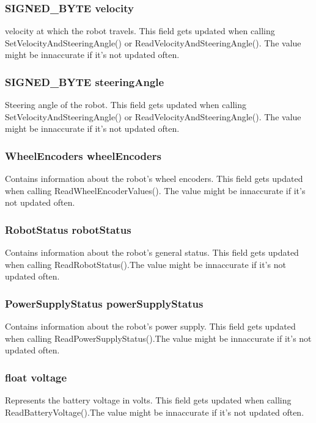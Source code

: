\documentclass{book}
\begin{document}
\subsubsection{SIGNED\_BYTE velocity} velocity at which the robot travels. This field gets updated when calling SetVelocityAndSteeringAngle() or ReadVelocityAndSteeringAngle(). The value might be innaccurate if it's not updated often.\\
\subsubsection{SIGNED\_BYTE steeringAngle}
Steering angle of the robot.  This field gets updated when calling SetVelocityAndSteeringAngle() or ReadVelocityAndSteeringAngle(). The value might be innaccurate if it's not updated often.\\

\subsubsection{WheelEncoders wheelEncoders}
Contains information about the robot's wheel encoders. This field gets updated when calling ReadWheelEncoderValues(). The value might be innaccurate if it's not updated often.\\

\subsubsection{RobotStatus robotStatus}
Contains information about the robot's general status. This field gets updated when calling ReadRobotStatus().The value might be innaccurate if it's not updated often.\\
\subsubsection{PowerSupplyStatus powerSupplyStatus}
Contains information about the robot's power supply. This field gets updated when calling ReadPowerSupplyStatus().The value might be innaccurate if it's not updated often.\\
	
\subsubsection{float voltage}
Represents the battery voltage in volts. This field gets updated when calling ReadBatteryVoltage().The value might be innaccurate if it's not updated often.\\
\end{document}
